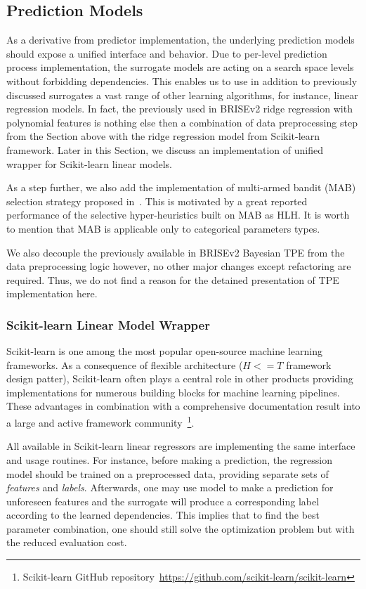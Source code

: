 \subsection{Prediction Models}\label{impl: prediction models}
As a derivative from predictor implementation, the underlying prediction models should expose a unified interface and behavior. Due to per-level prediction process implementation, the surrogate models are acting on a search space levels without forbidding dependencies. This enables us to use in addition to previously discussed surrogates a vast range of other learning algorithms, for instance, linear regression models. In fact, the previously used in BRISEv2 ridge regression with polynomial features is nothing else then a combination of data preprocessing step from the Section above with the ridge regression model from Scikit-learn framework. Later in this Section, we discuss an implementation of unified wrapper for Scikit-learn linear models.

As a step further, we also add the implementation of multi-armed bandit (MAB) selection strategy proposed in~\cite{auer2002finite}. This is motivated by a great reported performance of the selective hyper-heuristics built on MAB as HLH. It is worth to mention that MAB is applicable only to categorical parameters types.

We also decouple the previously available in BRISEv2 Bayesian TPE from the data preprocessing logic however, no other major changes except refactoring are required. Thus, we do not find a reason for the detained presentation of TPE implementation here.

\subsubsection{Scikit-learn Linear Model Wrapper}\label{impl: sklearn wrapper}
Scikit-learn is one among the most popular open-source machine learning frameworks. As a consequence of flexible architecture ($H<=T$ framework design patter), Scikit-learn often plays a central role in other products providing implementations for numerous building blocks for machine learning pipelines. These advantages in combination with a comprehensive documentation result into a large and active framework community~\footnote{Scikit-learn GitHub repository~\url{https://github.com/scikit-learn/scikit-learn}}.

All available in Scikit-learn linear regressors are implementing the same interface and usage routines. For instance, before making a prediction, the regression model should be trained on a preprocessed data, providing separate sets of \emph{features} and \emph{labels}. Afterwards, one may use model to make a prediction for unforeseen features and the surrogate will produce a corresponding label according to the learned dependencies. This implies that to find the best parameter combination, one should still solve the optimization problem but with the reduced evaluation cost.

